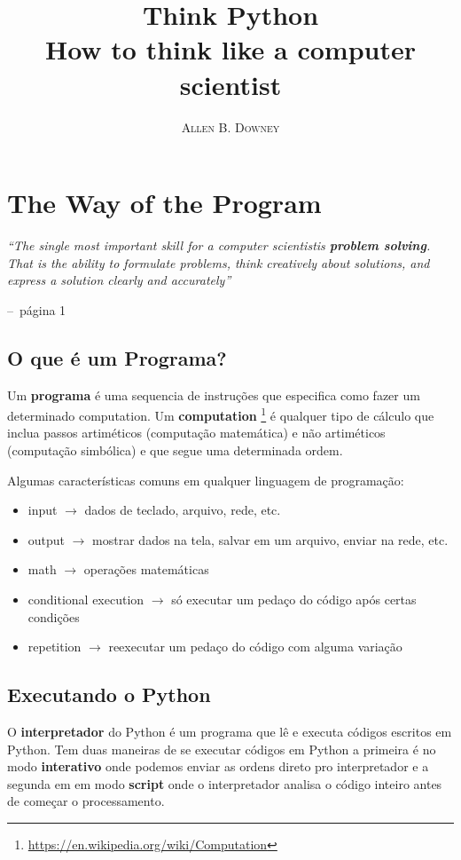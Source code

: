 \documentclass[a4paper,11pt]{book}
\title{\Huge \textbf{Think Python}  \\ \huge How to think like a computer scientist }
\author{\textsc{Allen B. Downey}}
\makeatletter
\newenvironment{chapquote}[2][2em]
  {\setlength{\@tempdima}{#1}%
   \def\chapquote@author{#2}%
   \parshape 1 \@tempdima \dimexpr\textwidth-2\@tempdima\relax%
   \itshape}
  {\par\normalfont\hfill--\ \chapquote@author\hspace*{\@tempdima}\par\bigskip}
\makeatother
\begin{document}
\frontmatter
\maketitle

\tableofcontents

\mainmatter

\chapter{The Way of the Program}
\begin{chapquote}{página 1}
	``The single most important skill for a computer scientistis \textbf{problem solving}. That is the 
	ability to formulate problems, think creatively about solutions, and express a solution clearly and 
	accurately''
\end{chapquote}

\section{O que é um Programa?}
Um \textbf{programa} é uma sequencia de instruções que especifica como fazer um determinado computation. Um \textbf{computation}
\footnote{\href{https://en.wikipedia.org/wiki/Computation}{https://en.wikipedia.org/wiki/Computation}} é qualquer tipo de cálculo que inclua 
passos artiméticos (computação matemática) e não artiméticos (computação simbólica) e que segue uma determinada ordem. \par
Algumas características comuns em qualquer linguagem de programação:
\begin{itemize}
	\item input $\rightarrow$ dados de teclado, arquivo, rede, etc.
	\item output $\rightarrow$ mostrar dados na tela, salvar em um arquivo, enviar na rede, etc.
	\item math $\rightarrow$ operações matemáticas
	\item conditional execution $\rightarrow$ só executar um pedaço do código após certas condições
	\item repetition $\rightarrow$ reexecutar um pedaço do código com alguma variação
\end{itemize}

\section{Executando o Python}
O \textbf{interpretador} do Python é um programa que lê e executa códigos escritos em Python. Tem duas maneiras de se executar códigos em Python
a primeira é no modo \textbf{interativo} onde podemos enviar as ordens direto pro interpretador e a segunda em em modo \textbf{script} onde
o interpretador analisa o código inteiro antes de começar o processamento.
\end{document}
